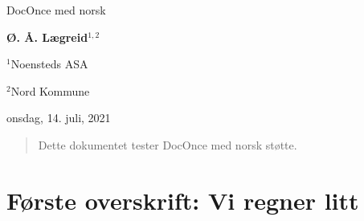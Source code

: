 \documentclass[%
norsk,oneside,                 %
final,                   %
10pt]{article}
\begin{document}

\newcommand{\exercisesection}[1]{\subsection*{#1}}








\thispagestyle{empty}

\begin{center}
{\LARGE\bf
\begin{spacing}{1.25}
DocOnce med norsk
\end{spacing}
}
\end{center}


\begin{center}
{\bf Ø. Å. Lægreid${}^{1, 2}$} \\ [0mm]
\end{center}

\begin{center}
\centerline{{\small ${}^1$Noensteds ASA}}
\centerline{{\small ${}^2$Nord Kommune}}
\end{center}
    

\begin{center}
onsdag, 14. juli, 2021
\end{center}

\vspace{1cm}



\begin{abstract}
Dette dokumentet tester DocOnce med norsk støtte.
\end{abstract}

\tableofcontents

\vspace{1cm} %

\section{Første overskrift: Vi regner litt}
\end{document}
